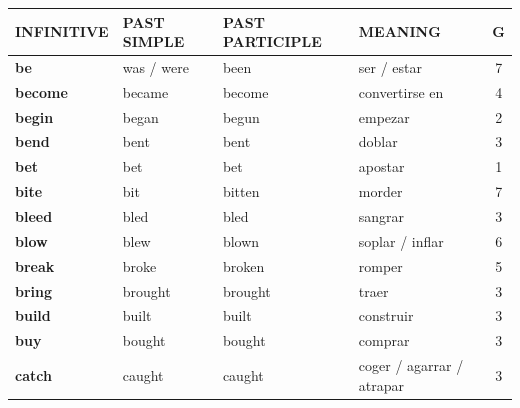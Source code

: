 \documentclass[11pt,a4paper]{article}
\renewcommand{\arraystretch}{1.0}\setlength{\LTpre}{2pt}\setlength{\LTpost}{2pt}
\begin{document}
\renewcommand{\arraystretch}{1.2}
\begin{longtable}{>{\bfseries}p{2.6cm}p{3.4cm}p{3.6cm}>{\raggedright\arraybackslash}p{6.0cm}c}
\small\textbf{INFINITIVE} & \small\textbf{PAST SIMPLE} & \small\textbf{PAST\,PARTICIPLE} & \small\textbf{MEANING} & \small\textbf{G}\\[1pt]\endhead
\textcolor{azulO}{be} & \textcolor{azulO}{was / were} & \textcolor{azulO}{been} & \textcolor{azulO}{ser / estar} & \textcolor{azulO}{7}\\
\textcolor{moradoO}{become} & \textcolor{moradoO}{became} & \textcolor{moradoO}{become} & \textcolor{moradoO}{convertirse en} & \textcolor{moradoO}{4}\\
\textcolor{naranjaO}{begin} & \textcolor{naranjaO}{began} & \textcolor{naranjaO}{begun} & \textcolor{naranjaO}{empezar} & \textcolor{naranjaO}{2}\\
\textcolor{verdeO}{bend} & \textcolor{verdeO}{bent} & \textcolor{verdeO}{bent} & \textcolor{verdeO}{doblar} & \textcolor{verdeO}{3}\\
\textcolor{amarilloO}{bet} & \textcolor{amarilloO}{bet} & \textcolor{amarilloO}{bet} & \textcolor{amarilloO}{apostar} & \textcolor{amarilloO}{1}\\
\textcolor{azulO}{bite} & \textcolor{azulO}{bit} & \textcolor{azulO}{bitten} & \textcolor{azulO}{morder} & \textcolor{azulO}{7}\\
\textcolor{verdeO}{bleed} & \textcolor{verdeO}{bled} & \textcolor{verdeO}{bled} & \textcolor{verdeO}{sangrar} & \textcolor{verdeO}{3}\\
\textcolor{rosaO}{blow} & \textcolor{rosaO}{blew} & \textcolor{rosaO}{blown} & \textcolor{rosaO}{soplar / inflar} & \textcolor{rosaO}{6}\\
\textcolor{rojoO}{break} & \textcolor{rojoO}{broke} & \textcolor{rojoO}{broken} & \textcolor{rojoO}{romper} & \textcolor{rojoO}{5}\\
\textcolor{verdeO}{bring} & \textcolor{verdeO}{brought} & \textcolor{verdeO}{brought} & \textcolor{verdeO}{traer} & \textcolor{verdeO}{3}\\
\textcolor{verdeO}{build} & \textcolor{verdeO}{built} & \textcolor{verdeO}{built} & \textcolor{verdeO}{construir} & \textcolor{verdeO}{3}\\
\textcolor{verdeO}{buy} & \textcolor{verdeO}{bought} & \textcolor{verdeO}{bought} & \textcolor{verdeO}{comprar} & \textcolor{verdeO}{3}\\
\textcolor{verdeO}{catch} & \textcolor{verdeO}{caught} & \textcolor{verdeO}{caught} & \textcolor{verdeO}{coger / agarrar / atrapar} & \textcolor{verdeO}{3}\\

\end{longtable}
\end{document}
